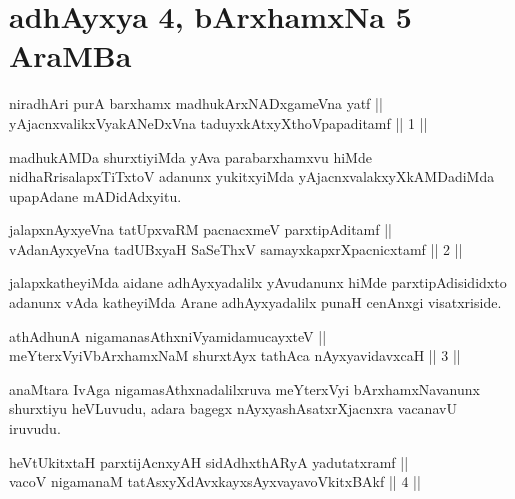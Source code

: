 \section*{adhAyxya 4, bArxhamxNa 5 AraMBa}


\begin{shl}
niradhAri purA barxhamx madhukArxNADxgameVna yatf || \\
yAjacnxvalikxVyakANeDxVna taduyxkAtxyX\s thoVpapaditamf ||  1 ||  
\end{shl}

\begin{artha}
madhukAMDa shurxtiyiMda yAva parabarxhamxvu hiMde nidhaRrisalapxTiTxtoV adanunx yukitxyiMda yAjacnxvalakxyXkAMDadiMda upapAdane mADidAdxyitu.
\end{artha}

\begin{shl}
jalapxnAyxyeVna tatUpxvaRM pacnacxmeV parxtipAditamf || \\
vAdanAyxyeVna tadUBxyaH SaSeThxV samayxkapxrXpacnicxtamf ||  2 ||  
\end{shl}

\begin{artha}
jalapxkatheyiMda aidane adhAyxyadalilx yAvudanunx hiMde parxtipAdisididxto adanunx vAda katheyiMda Arane adhAyxyadalilx punaH cenAnxgi visatxriside.
\end{artha}

\begin{shl}
athAdhunA nigamanasAthxniVyamidamucayxteV || \\
meYterxVyiVbArxhamxNaM shurxtAyx tathAca nAyxyavidavxcaH ||  3 ||  
\end{shl}

\begin{artha}
anaMtara IvAga nigamasAthxnadalilxruva meYterxVyi bArxhamxNavanunx shurxtiyu heVLuvudu, adara bagegx nAyxyashAsatxrXjacnxra vacanavU iruvudu.
\end{artha}


\begin{shl}
\footnotemark[1]heVtUkitxtaH parxtijAcnxyAH sidAdhxthARyA yadutatxramf || \\
vacoV nigamanaM tatAsxyXdAvxkayxsAyxvayavoVkitxBAkf ||  4 ||  
\end{shl}

